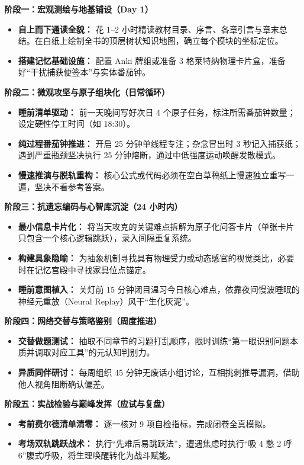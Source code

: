 \documentclass[12pt,a4paper,openany]{ctexbook}
\begin{document}
\begin{practicebox}
\textbf{阶段一：宏观测绘与地基铺设（Day 1）}
\begin{itemize}
    \item \textbf{自上而下通读全貌：} 花 1--2 小时精读教材目录、序言、各章引言与章末总结。在白纸上绘制全书的顶层树状知识地图，确立每个模块的坐标定位。
    \item \textbf{搭建记忆基础设施：} 配置 Anki 牌组或准备 3 格莱特纳物理卡片盒，准备好“干扰捕获便签本”与实体番茄钟。
\end{itemize}

\textbf{阶段二：微观攻坚与原子组块化（日常循环）}
\begin{itemize}
    \item \textbf{睡前清单驱动：} 前一天晚间写好次日 4 个原子任务，标注所需番茄钟数量；设定硬性停工时间（如 18:30）。
    \item \textbf{纯过程番茄钟推进：} 开启 25 分钟单线程专注；杂念冒出时 3 秒记入捕获纸；遇到严重瓶颈坚决执行 25 分钟熔断，通过中低强度运动唤醒发散模式。
    \item \textbf{慢速推演与脱轨重构：} 核心公式或代码必须在空白草稿纸上慢速独立重写一遍，坚决不看参考答案。
\end{itemize}

\textbf{阶段三：抗遗忘编码与心智库沉淀（24 小时内）}
\begin{itemize}
    \item \textbf{最小信息卡片化：} 将当天攻克的关键难点拆解为原子化问答卡片（单张卡片只包含一个核心逻辑跳跃），录入间隔重复系统。
    \item \textbf{构建具象隐喻：} 为抽象机制寻找具有物理受力或动态感官的视觉类比，必要时在记忆宫殿中寻找家具位点锚定。
    \item \textbf{睡前意图植入：} 关灯前 15 分钟闭目温习今日核心难点，依靠夜间慢波睡眠的神经元重放（Neural Replay）风干“生化灰泥”。
\end{itemize}

\textbf{阶段四：网络交替与策略鉴别（周度推进）}
\begin{itemize}
    \item \textbf{交替做题测试：} 抽取不同章节的习题打乱顺序，限时训练“第一眼识别问题本质并调取对应工具”的元认知判别力。
    \item \textbf{异质同伴研讨：} 每周组织 45 分钟无废话小组讨论，互相挑刺推导漏洞，借助他人视角阻断确认偏差。
\end{itemize}

\textbf{阶段五：实战检验与巅峰发挥（应试与复盘）}
\begin{itemize}
    \item \textbf{考前费尔德清单清零：} 逐一核对 9 项自检指标，完成闭卷全真模拟。
    \item \textbf{考场双轨跳跃战术：} 执行“先难后易跳跃法”，遭遇焦虑时执行“吸 4 憋 2 呼 6”腹式呼吸，将生理唤醒转化为战斗赋能。
\end{itemize}
\end{practicebox}
\end{document}
